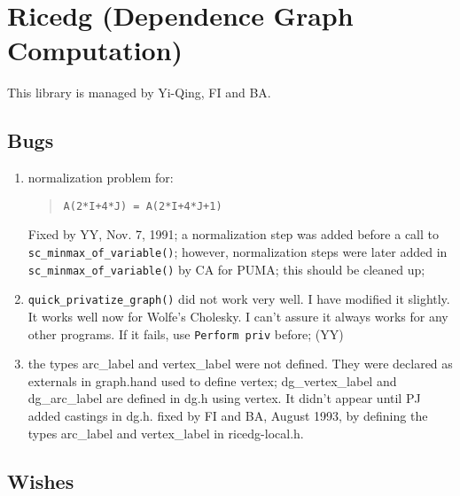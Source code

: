 \newpage
\section{Ricedg (Dependence Graph Computation)}

This library is managed by Yi-Qing, FI and BA.

\subsection{Bugs}

\begin{enumerate}

  \item {} normalization problem for:
	\begin{quote}
\begin{verbatim}
A(2*I+4*J) = A(2*I+4*J+1)
\end{verbatim}
	\end{quote}
	Fixed by YY, Nov. 7, 1991; a normalization step was added before
	a call to \verb+sc_minmax_of_variable()+; 
	however, normalization steps
	were later added in \verb+sc_minmax_of_variable()+ by CA for PUMA;
	this should be cleaned up;
  \item \verb+quick_privatize_graph()+ did not work very well. I have
	modified it slightly. It works well now for Wolfe's Cholesky. I can't assure
	it always works for any other programs. If it fails, use
	\verb+Perform priv+ before; (YY)

  \item	the types arc_label and vertex_label were not defined. They were
	declared as externals in graph.hand used to define vertex;  
	dg_vertex_label and dg_arc_label are defined in dg.h using
	vertex.
	It didn't appear until PJ added castings in dg.h.
	fixed by FI and BA, August 1993, by defining the types arc_label
	and vertex_label in ricedg-local.h.

\end{enumerate}

\subsection{Wishes}

